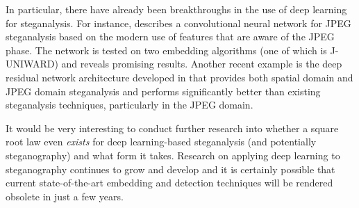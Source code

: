 \documentclass[11pt,a4paper,twoside,openright]{report}
\begin{document}
In particular, there have already been breakthroughs in the use of deep learning for steganalysis. For instance, \cite{steganalysis-cnn} describes a convolutional neural network for JPEG steganalysis based on the modern use of features that are aware of the JPEG phase. The network is tested on two embedding algorithms (one of which is J-UNIWARD) and reveals promising results. Another recent example is the deep residual network architecture developed in \cite{deep-residual-network} that provides both spatial domain and JPEG domain steganalysis and performs significantly better than existing steganalysis techniques, particularly in the JPEG domain.

It would be very interesting to conduct further research into whether a square root law even \textit{exists} for deep learning-based steganalysis (and potentially steganography) and what form it takes. Research on applying deep learning to steganography continues to grow and develop and it is certainly possible that current state-of-the-art embedding and detection techniques will be rendered obsolete in just a few years.


{}

\end{document}
